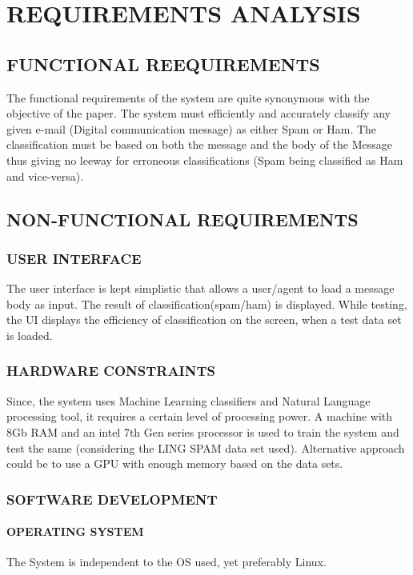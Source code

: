 
\chapter{REQUIREMENTS ANALYSIS} %

\section{FUNCTIONAL REEQUIREMENTS}

The functional requirements of the system are quite synonymous with the objective of the paper. The system must efficiently and accurately classify any given e-mail (Digital communication message) as either Spam or Ham. The classification must be based on both the message and the body of the Message thus giving no leeway for erroneous classifications (Spam being classified as Ham and vice-versa). 
\section{NON-FUNCTIONAL REQUIREMENTS}
\subsection{USER INTERFACE}

The user interface is kept simplistic that allows a user/agent to load a message body as input. The result of classification(spam/ham) is displayed. While testing, the UI displays the efficiency of classification on the screen, when a test data set is loaded. 

\subsection{HARDWARE CONSTRAINTS}

Since, the system uses Machine Learning classifiers and Natural Language processing tool, it requires a certain level of processing power. A machine with 8Gb RAM and an intel 7th Gen series processor is used to train the system and test the same (considering the LING SPAM data set used). Alternative approach could be to use a GPU with enough memory based on the data sets.

\subsection{SOFTWARE DEVELOPMENT}
\subsubsection{OPERATING SYSTEM} The System is independent to the OS used, yet preferably Linux. 

